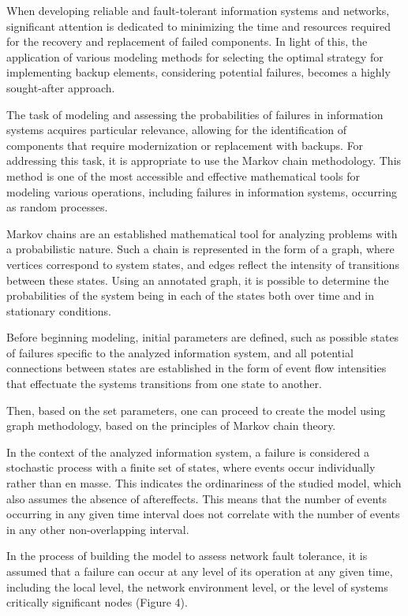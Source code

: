 \begin{multicols}{2}
When developing reliable and fault-tolerant information systems and
networks, significant attention is dedicated to minimizing the time and
resources required for the recovery and replacement of failed
components. In light of this, the application of various modeling
methods for selecting the optimal strategy for implementing backup
elements, considering potential failures, becomes a highly sought-after
approach.

The task of modeling and assessing the probabilities of failures in
information systems acquires particular relevance, allowing for the
identification of components that require modernization or replacement
with backups. For addressing this task, it is appropriate to use the
Markov chain methodology. This method is one of the most accessible and
effective mathematical tools for modeling various operations, including
failures in information systems, occurring as random processes.

Markov chains are an established mathematical tool for analyzing
problems with a probabilistic nature. Such a chain is represented in the
form of a graph, where vertices correspond to system states, and edges
reflect the intensity of transitions between these states. Using an
annotated graph, it is possible to determine the probabilities of the
system being in each of the states both over time and in stationary
conditions.

Before beginning modeling, initial parameters are defined, such as
possible states of failures specific to the analyzed information system,
and all potential connections between states are established in the form
of event flow intensities that effectuate the system\textquotesingle s
transitions from one state to another.

Then, based on the set parameters, one can proceed to create the model
using graph methodology, based on the principles of Markov chain theory.

In the context of the analyzed information system, a failure is
considered a stochastic process with a finite set of states, where
events occur individually rather than en masse. This indicates the
ordinariness of the studied model, which also assumes the absence of
aftereffects. This means that the number of events occurring in any
given time interval does not correlate with the number of events in any
other non-overlapping interval.

In the process of building the model to assess network fault tolerance,
it is assumed that a failure can occur at any level of its operation at
any given time, including the local level, the network environment
level, or the level of system\textquotesingle s critically significant
nodes (Figure 4).
\end{multicols}

